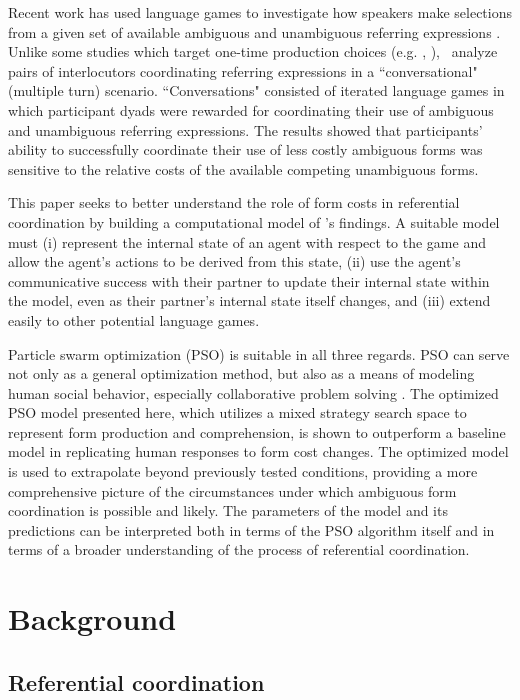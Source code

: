 \documentclass[a4paper,11pt]{article}
\begin{document}
Recent work has used language games to investigate how speakers make selections from a given set of available ambiguous and unambiguous referring expressions \cite{rohde2012,degen2012,frank2012}. Unlike some studies which target one-time production choices (e.g. \citeauthor{degen2012}, ), \citeauthor{rohde2012}\ analyze pairs of interlocutors coordinating referring expressions in a ``conversational" (multiple turn) scenario. ``Conversations" consisted of iterated language games in which participant dyads were rewarded for coordinating their use of ambiguous and unambiguous referring expressions. The results showed that participants' ability to successfully coordinate their use of less costly ambiguous forms was sensitive to the relative costs of the available competing unambiguous forms. 

This paper seeks to better understand the role of form costs in referential coordination by building a computational model of \citeauthor{rohde2012}'s findings. A suitable model must (i) represent the internal state of an agent with respect to the game and allow the agent's actions to be derived from this state, (ii) use the agent's communicative success with their partner to update their internal state within the model, even as their partner's internal state itself changes, and (iii) extend easily to other potential language games. 

Particle swarm optimization (PSO) is suitable in all three regards. PSO can serve not only as a general optimization method, but also as a means of modeling human social behavior, especially collaborative problem solving \cite{kennedy1997}. The optimized PSO model presented here, which utilizes a mixed strategy search space to represent form production and comprehension, is shown to outperform a baseline model in replicating human responses to form cost changes. The optimized model is used to extrapolate beyond previously tested conditions, providing a more comprehensive picture of the circumstances under which ambiguous form coordination is possible and likely. The parameters of the model and its predictions can be interpreted both in terms of the PSO algorithm itself and in terms of a broader understanding of the process of referential coordination.


\section{Background}
\subsection{Referential coordination}
\end{document}
